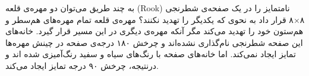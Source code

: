 \p
به چند طریق می‌توان دو مهره‌ی قلعه
(Rook)
نامتمایز را در یک صفحه‌ی شطرنجی ۸×۸ قرار داد به نحوی که یکدیگر را تهدید نکنند؟
مهره‌ی قلعه تمام مهره‌های هم‌سطر و هم‌ستون خود را تهدید می‌کند مگر آنکه مهره‌ی دیگری در
این مسیر قرار گیرد.
خانه‌های این صفحه شطرنجی نام‌گذاری نشده‌اند و چرخش ۱۸۰ درجه‌ی صفحه در چینش مهره‌ها
تمایز ایجاد نمی‌کند. اما خانه‌های صفحه با رنگ‌های سیاه و سفید رنگ‌آمیزی شده اند و
درنتیجه، چرخش ۹۰ درجه تمایز ایجاد می‌کند. 